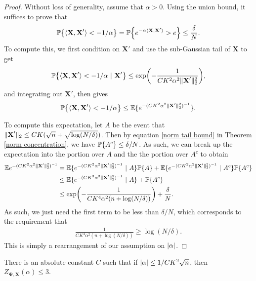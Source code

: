 \documentclass[final,12pt]{colt2018} %
\numberwithin{equation}{section}
\DeclarePairedDelimiter{\abs}{\lvert}{\rvert}
\DeclarePairedDelimiter{\norm}{\lVert}{\rVert}
\DeclarePairedDelimiter{\paren}{(}{)}
\DeclarePairedDelimiter{\braces}{\lbrace}{\rbrace}
\DeclarePairedDelimiter{\inprod}{\langle}{\rangle}
\renewcommand{\P}{\mathbb{P}}
\newcommand{\E}{\mathbb{E}}
\newcommand{\boldPsi}{\boldsymbol{\Psi}}
\newcommand{\boldX}{\textbf{X}}
\newcommand{\st}{\ | \ }
\begin{document}
\begin{proof}
	Without loss of generality, assume that $\alpha > 0$. Using the union bound, it suffices to prove that
	\begin{align}
	\P\braces*{\inprod{\boldX,\boldX'} < -1/\alpha} = \P\braces*{e^{-\alpha\inprod{\boldX,\boldX'}} > e} \leq \frac{\delta}{N}.
	\end{align}
	To compute this, we first condition on $\boldX'$ and use the sub-Gaussian tail of $\boldX$ to get
	\begin{align*}
	\P\braces*{\inprod{\boldX,\boldX'} < -1/\alpha \st \boldX'} \leq \exp\paren*{-\frac{1}{CK^2\alpha^2\norm{\boldX'}_2^2}},
	\end{align*}
	and integrating out $\boldX'$, then gives
	\begin{align}
	\P\braces*{\inprod{\boldX,\boldX'} < - 1/\alpha} \leq \E \braces{e^{-\paren{CK^2\alpha^2\norm{\boldX'}_2^2}^{-1}}}.
	\end{align}
	
	To compute this expectation, let $A$ be the event that $\norm{\boldX'}_2 \leq CK (\sqrt{n}+\sqrt{\log(N/\delta)})$. Then by equation \eqref{norm tail bound} in Theorem \ref{norm concentration}, we have $\P\braces*{A^c} \leq \delta/N$. As such, we can break up the expectation into the portion over $A$ and the the portion over $A^c$ to obtain
	\begin{align}
	\E e^{-\paren{CK^2\alpha^2\norm{\boldX'}_2^2}^{-1}} & = \E\braces{e^{-\paren{CK^2\alpha^2\norm{\boldX'}_2^2}^{-1}} \st A}\P\braces*{A} + \E\braces{e^{-\paren{CK^2\alpha^2\norm{\boldX'}_2^2}^{-1}} \st A^c}\P\braces*{A^c} \nonumber \\
	& \leq  \E\braces{e^{-\paren{CK^2\alpha^2\norm{\boldX'}_2^2}^{-1}} \st A} + \P\braces*{A^c} \nonumber \\
	& \leq \exp\paren*{-\frac{1}{CK^4\alpha^2(n+\log(N/\delta))}} + \frac{\delta}{N}.
	\end{align}
	As such, we just need the first term to be less than $\delta/N$, which corresponds to the requirement that
	\begin{align*}
	\frac{1}{CK^4\alpha^2(n+\log(N/\delta))} \geq \log(N/\delta).
	\end{align*}
	This is simply a rearrangement of our assumption on $\abs{\alpha}$.
\end{proof}

\begin{lemma}[Better bound for $Z_{\boldPsi}$] \label{better bound for psi}
	There is an absolute constant $C$ such that if $\abs{\alpha} \leq 1/CK^2\sqrt{n}$, then $Z_{\boldPsi,\boldX}(\alpha) \leq 3$.
\end{lemma}
\end{document}
